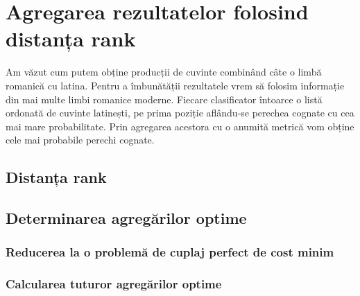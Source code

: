 \chapter{Agregarea rezultatelor folosind distanța rank}
Am văzut cum putem obține producții de cuvinte combinând câte o limbă romanică cu latina.
Pentru a îmbunătății rezultatele vrem să folosim informație din mai multe limbi romanice 
moderne. Fiecare clasificator întoarce o listă ordonată de cuvinte latinești, pe prima 
poziție aflându-se perechea cognate cu cea mai mare probabilitate. Prin agregarea acestora
cu o anumită metrică vom obține cele mai probabile perechi cognate.
\section{Distanța rank}
 
\section{Determinarea agregărilor optime}
\subsection{Reducerea la o problemă de cuplaj perfect de cost minim}
\subsection{Calcularea tuturor agregărilor optime}
